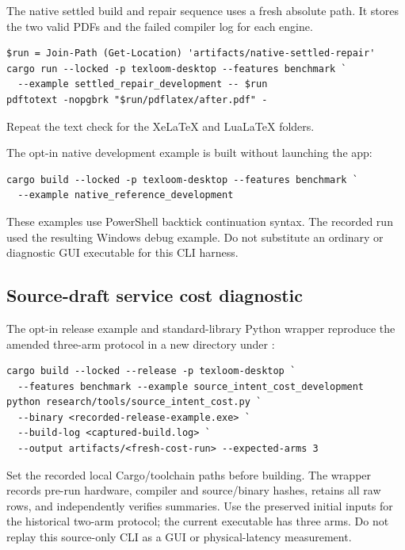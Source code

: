 The native settled build and repair sequence uses a fresh absolute path.
It stores the two valid PDFs and the failed compiler log for each engine.
\begin{verbatim}
$run = Join-Path (Get-Location) 'artifacts/native-settled-repair'
cargo run --locked -p texloom-desktop --features benchmark `
  --example settled_repair_development -- $run
pdftotext -nopgbrk "$run/pdflatex/after.pdf" -
\end{verbatim}
Repeat the text check for the Xe\LaTeX{} and Lua\LaTeX{} folders.

The opt-in native development example is built without launching the app:
\begin{verbatim}
cargo build --locked -p texloom-desktop --features benchmark `
  --example native_reference_development
\end{verbatim}
These examples use PowerShell backtick continuation syntax. The recorded
run used the resulting Windows debug example. Do not substitute an ordinary
or diagnostic GUI executable for this CLI harness.

\begin{minipage}{\linewidth}
\subsection{Source-draft service cost diagnostic}
The opt-in release example and standard-library Python wrapper reproduce the
amended three-arm protocol in a new directory under :
\begin{verbatim}
cargo build --locked --release -p texloom-desktop `
  --features benchmark --example source_intent_cost_development
python research/tools/source_intent_cost.py `
  --binary <recorded-release-example.exe> `
  --build-log <captured-build.log> `
  --output artifacts/<fresh-cost-run> --expected-arms 3
\end{verbatim}
Set the recorded local Cargo/toolchain paths before building. The wrapper
records pre-run hardware, compiler and source/binary hashes, retains all raw
rows, and independently verifies summaries. Use the preserved initial inputs
for the historical two-arm protocol; the current executable has three arms.
Do not replay this source-only CLI as a GUI or physical-latency measurement.
\end{minipage}

